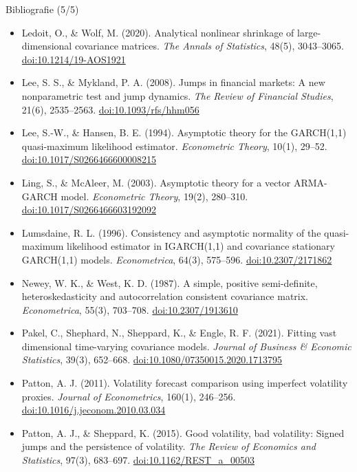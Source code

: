 \begin{frame}{Bibliografie (5/5)}
\itemsize{\tiny}
\begin{itemize}
    \item Ledoit, O., \& Wolf, M. (2020). Analytical nonlinear shrinkage of large-dimensional covariance matrices. \textit{The Annals of Statistics}, 48(5), 3043--3065. \href{https://doi.org/10.1214/19-AOS1921}{doi:10.1214/19-AOS1921}
    \item Lee, S. S., \& Mykland, P. A. (2008). Jumps in financial markets: A new nonparametric test and jump dynamics. \textit{The Review of Financial Studies}, 21(6), 2535--2563. \href{https://doi.org/10.1093/rfs/hhm056}{doi:10.1093/rfs/hhm056}
    \item Lee, S.-W., \& Hansen, B. E. (1994). Asymptotic theory for the GARCH(1,1) quasi-maximum likelihood estimator. \textit{Econometric Theory}, 10(1), 29--52. \href{https://doi.org/10.1017/S0266466600008215}{doi:10.1017/S0266466600008215}
    \item Ling, S., \& McAleer, M. (2003). Asymptotic theory for a vector ARMA-GARCH model. \textit{Econometric Theory}, 19(2), 280--310. \href{https://doi.org/10.1017/S0266466603192092}{doi:10.1017/S0266466603192092}
    \item Lumsdaine, R. L. (1996). Consistency and asymptotic normality of the quasi-maximum likelihood estimator in IGARCH(1,1) and covariance stationary GARCH(1,1) models. \textit{Econometrica}, 64(3), 575--596. \href{https://doi.org/10.2307/2171862}{doi:10.2307/2171862}
    \item Newey, W. K., \& West, K. D. (1987). A simple, positive semi-definite, heteroskedasticity and autocorrelation consistent covariance matrix. \textit{Econometrica}, 55(3), 703--708. \href{https://doi.org/10.2307/1913610}{doi:10.2307/1913610}
    \item Pakel, C., Shephard, N., Sheppard, K., \& Engle, R. F. (2021). Fitting vast dimensional time-varying covariance models. \textit{Journal of Business \& Economic Statistics}, 39(3), 652--668. \href{https://doi.org/10.1080/07350015.2020.1713795}{doi:10.1080/07350015.2020.1713795}
    \item Patton, A. J. (2011). Volatility forecast comparison using imperfect volatility proxies. \textit{Journal of Econometrics}, 160(1), 246--256. \href{https://doi.org/10.1016/j.jeconom.2010.03.034}{doi:10.1016/j.jeconom.2010.03.034}
    \item Patton, A. J., \& Sheppard, K. (2015). Good volatility, bad volatility: Signed jumps and the persistence of volatility. \textit{The Review of Economics and Statistics}, 97(3), 683--697. \href{https://doi.org/10.1162/REST_a_00503}{doi:10.1162/REST\_a\_00503}

\end{itemize}
\end{frame}
